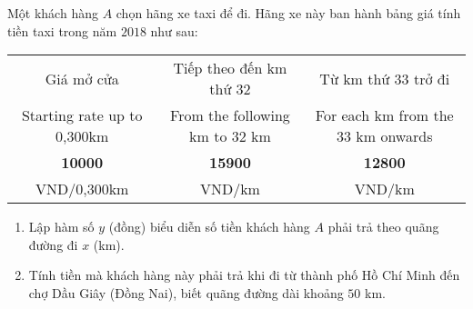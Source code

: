 \begin{bt}%
	Một khách hàng $A$ chọn hãng xe taxi để đi. Hãng xe này ban hành bảng giá tính tiền taxi trong năm $2018$ như sau:

	\begin{center}
	\begin{tabular}{ |c|c|c| }
		\hline
		Giá mở cửa & Tiếp theo đến km thứ 32 & Từ km thứ 33 trở đi \\ 
		Starting rate up to 0,300km & From the following km to 32 km& For each km from the 33 km onwards\\
		\hline 
		\textbf{10000} & \textbf{15900 }& \textbf{12800 }    \\  
		VND/0,300km & VND/km & VND/km     \\  
		\hline
	\end{tabular}
\end{center}
	
	\begin{enumerate}
		\item Lập hàm số $y$ (đồng) biểu diễn số tiền khách hàng $A$ phải trả theo quãng đường đi $x$ (km).
		\item Tính tiền mà khách hàng này phải trả khi đi từ thành phố Hồ Chí Minh đến chợ Dầu Giây (Đồng Nai), biết quãng đường dài khoảng $50$ km.
	\end{enumerate}
\end{bt}

